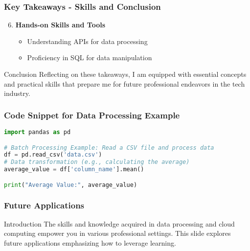 \documentclass[aspectratio=169]{beamer}
\begin{document}
\begin{frame}[fragile]
    \frametitle{Key Takeaways - Skills and Conclusion}
    \begin{enumerate}
        \setcounter{enumi}{5}
        \item \textbf{Hands-on Skills and Tools}
            \begin{itemize}
                \item Understanding APIs for data processing
                \item Proficiency in SQL for data manipulation
            \end{itemize}
    \end{enumerate}
    \begin{block}{Conclusion}
        Reflecting on these takeaways, I am equipped with essential concepts and practical skills that prepare me for future professional endeavors in the tech industry.
    \end{block}
\end{frame}

\begin{frame}[fragile]
    \frametitle{Code Snippet for Data Processing Example}
    \begin{lstlisting}[language=Python]
import pandas as pd

# Batch Processing Example: Read a CSV file and process data
df = pd.read_csv('data.csv')
# Data transformation (e.g., calculating the average)
average_value = df['column_name'].mean()

print("Average Value:", average_value)
    \end{lstlisting}
\end{frame}

\begin{frame}[fragile]
    \frametitle{Future Applications}
    \begin{block}{Introduction}
        The skills and knowledge acquired in data processing and cloud computing empower you in various professional settings. This slide explores future applications emphasizing how to leverage learning.
    \end{block}
\end{frame}
\end{document}
